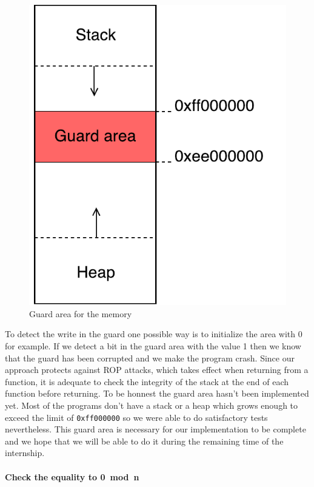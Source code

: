 \documentclass[11pt]{sdm}
\begin{document}
\begin{figure}[!ht]
\centering
\includegraphics[scale=0.6]{images/guard.pdf}
\caption{Guard area for the memory}
\label{guard}
\end{figure}

To detect the write in the guard one possible way is to initialize the area with 0 for example. If we detect a bit in the guard area with the value 1 then we know that the guard has been corrupted and we make the program crash. Since our approach protects against ROP attacks, which takes effect when returning from a function, it is adequate to check the integrity of the stack at the end of each function before returning.
To be honnest the guard area hasn't been implemented yet. Most of the programs don't have a stack or a heap which grows enough to exceed the limit of \texttt{0xff000000} so we were able to do satisfactory tests nevertheless. This guard area is necessary for our implementation to be complete and we hope that we will be able to do it during the remaining time of the internship.

\paragraph{Check the equality to \textbf{0~mod~n}}
\label{par:Classic check}
 
\end{document}
